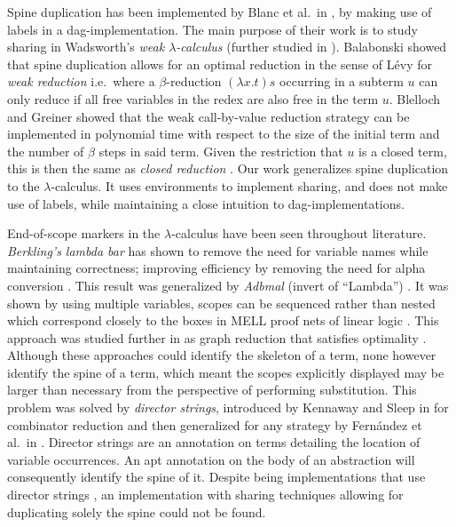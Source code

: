 \documentclass[a4paper,UKenglish,cleveref, autoref]{lipics-v2019}
\begin{document}
Spine duplication has been implemented by Blanc et al.\ in \cite{blanc2007sharing}, by making use of labels in a dag-implementation. The main purpose of their work is to study sharing in Wadsworth's \emph{weak $\lambda$-calculus} \cite{wadsworth1971semantics} (further studied in \cite{CAGMAN1998239}). Balabonski \cite{Balabonski12} showed that spine duplication allows for an optimal reduction in the sense of L\'{e}vy \cite{levy1980optimal} for \emph{weak reduction} i.e.\ where a $\beta$-reduction $(\lambda x . t) s$ occurring in a subterm $u$ can only reduce if all free variables in the redex are also free in the term $u$. Blelloch and Greiner \cite{Blelloch:1995:PSF:224164.224210} showed that the weak call-by-value reduction strategy can be implemented in polynomial time with respect to the size of the initial term and the number of $\beta$ steps in said term. Given the restriction that $u$ is a closed term, this is then the same as \emph{closed reduction} \cite{fernandez1999closed, fernandez2005closed}. Our work generalizes spine duplication to the $\lambda$-calculus. It uses environments to implement sharing, and does not make use of labels, while maintaining a close intuition to dag-implementations. 

End-of-scope markers in the $\lambda$-calculus have been seen throughout literature. \emph{Berkling's lambda bar} \cite{berkling1976symmetric} has shown to remove the need for variable names while maintaining correctness; improving efficiency by removing the need for alpha conversion \cite{BERKLING198289}. This result was generalized by \emph{Adbmal} (invert of ``Lambda'') \cite{hendriks2003lambda}. It was shown by using multiple variables, scopes can be sequenced rather than nested which correspond closely to the boxes in MELL proof nets of linear logic \cite{Lafont94fromproof-nets}. This approach was studied further in \cite{van2004lambdascope} as graph reduction that satisfies optimality \cite{levy1980optimal}. Although these approaches could identify the skeleton of a term, none however identify the spine of a term, which meant the scopes explicitly displayed may be larger than necessary from the perspective of performing substitution. This problem was solved by \emph{director strings}, introduced by Kennaway and Sleep in \cite{kennaway1988director} for combinator reduction and then generalized for any strategy by Fern\'{a}ndez et al.\ in \cite{fernandez2005lambda}. Director strings are an annotation on terms detailing the location of variable occurrences. An apt annotation on the body of an abstraction will consequently identify the spine of it. Despite being implementations that use director strings \cite{sinot2003efficient, fernandez2005lambda, fernandez2005closed}, an implementation with sharing techniques allowing for duplicating solely the spine could not be found. 
\end{document}
